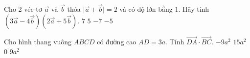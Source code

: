 \begin{ex}%
	Cho 2 véc-tơ $\overrightarrow{a} $ và $\overrightarrow{b} $ thỏa $\big| \overrightarrow{a}+\overrightarrow{b}\big| =2$ và có độ lớn bằng $ 1 $. Hãy tính $\left(3\overrightarrow{a}-4\overrightarrow{b}\right)\left(2\overrightarrow{a}+5\overrightarrow{b}\right)$.
	\choice
	{$7$}
	{$5$}
	{\True $-7$}
	{$-5$}
\end{ex}
\begin{ex}%
	Cho hình thang vuông $ABCD$ có đường cao $AD=3a$. Tính $\overrightarrow{DA}\cdot \overrightarrow{BC}$.
	\choice
	{\True $-9a^2$}
	{$15a^2$}
	{$0$}
	{$9a^2$}
\end{ex}

